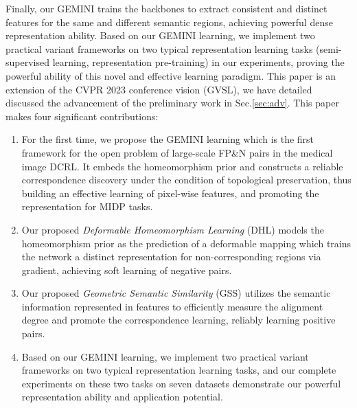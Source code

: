 Finally, our GEMINI trains the backbones to extract consistent and distinct features for the same and different semantic regions, achieving powerful dense representation ability. Based on our GEMINI learning, we implement two practical variant frameworks on two typical representation learning tasks (semi-supervised learning, representation pre-training) \cite{bengio2013representation} in our experiments, proving the powerful ability of this novel and effective learning paradigm. This paper is an extension of the CVPR 2023 conference vision (GVSL), we have detailed discussed the advancement of the preliminary work in Sec.\ref{sec:adv}. This paper makes four significant contributions:
\begin{enumerate}[leftmargin=*]
  \item For the first time, we propose the GEMINI learning which is the first framework for the open problem of large-scale FP\&N pairs in the medical image DCRL. It embeds the homeomorphism prior and constructs a reliable correspondence discovery under the condition of topological preservation, thus building an effective learning of pixel-wise features, and promoting the representation for MIDP tasks.
  \item Our proposed \emph{Deformable Homeomorphism Learning} (DHL) models the homeomorphism prior as the prediction of a deformable mapping which trains the network a distinct representation for non-corresponding regions via gradient, achieving soft learning of negative pairs.
  \item Our proposed \emph{Geometric Semantic Similarity} (GSS) utilizes the semantic information represented in features to efficiently measure the alignment degree and promote the correspondence learning, reliably learning positive pairs.
  \item Based on our GEMINI learning, we implement two practical variant frameworks on two typical representation learning tasks, and our complete experiments on these two tasks on seven datasets demonstrate our powerful representation ability and application potential.
\end{enumerate}

